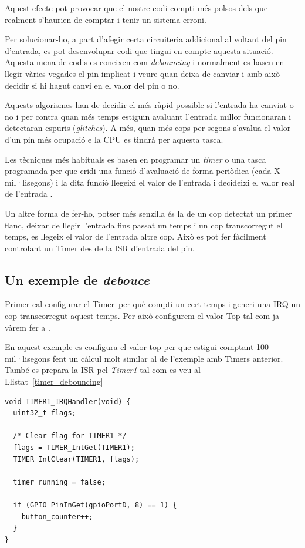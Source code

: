 Aquest efecte pot provocar que el nostre codi compti més polsos dels que realment s'haurien de comptar i tenir un sistema erroni.

Per solucionar-ho, a part d'afegir certa circuiteria addicional al voltant del pin d'entrada, es pot desenvolupar codi que tingui en compte aquesta situació. Aquesta mena de codis es coneixen com {\em debouncing} i normalment es basen en llegir vàries vegades el pin implicat i veure quan deixa de canviar i amb això decidir si hi hagut canvi en el valor del pin o no.

Aquests algorismes han de decidir el més ràpid possible si l'entrada ha canviat o no i per contra quan més temps estiguin avaluant l'entrada millor funcionaran i detectaran espuris ({\em glitches}). A més, quan més cops per segons s'avalua el valor d'un pin més ocupació e la CPU es tindrà per aquesta tasca.

Les tècniques més habituals es basen en programar un {\em timer} o una tasca programada per que cridi una funció d'avaluació de forma periòdica (cada X mil·lisegons) i la dita funció llegeixi el valor de l'entrada i decideixi el valor real de l'entrada \cite{debounce1}\cite{debounce2}.

Un altre forma de fer-ho, potser més senzilla és la de un cop detectat un primer flanc, deixar de llegir l'entrada fins passat un temps i un cop transcorregut el temps, es llegeix el valor de l'entrada altre cop. Això es pot fer fàcilment controlant un Timer des de la ISR d'entrada del pin.

\subsection{Un exemple de {\em debouce}}
Primer cal configurar el Timer per què compti un cert temps i generi una IRQ un cop transcorregut aquest temps. Per això configurem el valor Top tal com ja vàrem fer a .

En aquest exemple es configura el valor top per que estigui comptant 100 mil·lisegons fent un càlcul molt similar al de l'exemple amb Timers anterior. També es prepara la \gls{ISR} pel {\em Timer1} tal com es veu al Llistat~\ref{timer_debouncing}

\begin{lstlisting}[style=customc, caption=ISR del timer per fer debouncing, label=timer_debouncing]
void TIMER1_IRQHandler(void) {
  uint32_t flags;

  /* Clear flag for TIMER1 */
  flags = TIMER_IntGet(TIMER1);
  TIMER_IntClear(TIMER1, flags);

  timer_running = false;

  if (GPIO_PinInGet(gpioPortD, 8) == 1) {
    button_counter++;
  }
} 
\end{lstlisting}

